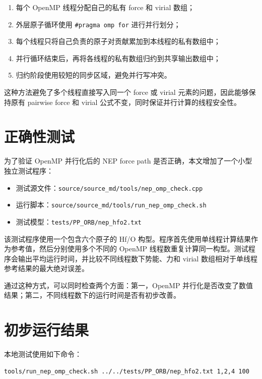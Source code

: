 \documentclass[11pt]{article}
\begin{document}
\begin{enumerate}
  \item 每个 OpenMP 线程分配自己的私有 force 和 virial 数组；
  \item 外层原子循环使用 \texttt{\#pragma omp for} 进行并行划分；
  \item 每个线程只将自己负责的原子对贡献累加到本线程的私有数组中；
  \item 并行循环结束后，再将各线程的私有数组归约到共享输出数组中；
  \item 归约阶段使用较短的同步区域，避免并行写冲突。
\end{enumerate}

这种方法避免了多个线程直接写入同一个 force 或 virial 元素的问题，因此能够保持原有 pairwise force 和 virial 公式不变，同时保证并行计算的线程安全性。

\section{正确性测试}

为了验证 OpenMP 并行化后的 NEP force path 是否正确，本文增加了一个小型独立测试程序：

\begin{itemize}
  \item 测试源文件：\texttt{source/source\_md/tools/nep\_omp\_check.cpp}
  \item 运行脚本：\texttt{source/source\_md/tools/run\_nep\_omp\_check.sh}
  \item 测试模型：\texttt{tests/PP\_ORB/nep\_hfo2.txt}
\end{itemize}

该测试程序使用一个包含六个原子的 Hf/O 构型。程序首先使用单线程计算结果作为参考值，然后分别使用多个不同的 OpenMP 线程数重复计算同一构型。测试程序会输出平均运行时间，并比较不同线程数下势能、力和 virial 数组相对于单线程参考结果的最大绝对误差。

通过这种方式，可以同时检查两个方面：第一，OpenMP 并行化是否改变了数值结果；第二，不同线程数下的运行时间是否有初步改善。

\section{初步运行结果}

本地测试使用如下命令：

\begin{lstlisting}[language=bash]
tools/run_nep_omp_check.sh ../../tests/PP_ORB/nep_hfo2.txt 1,2,4 100
\end{lstlisting}
\end{document}
